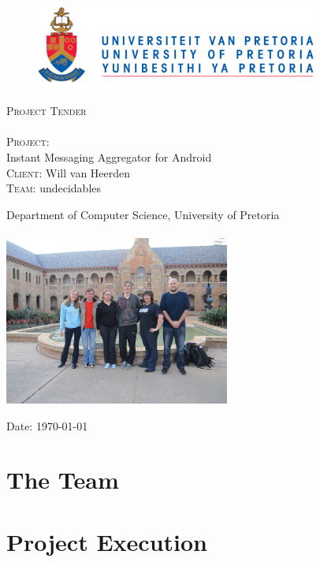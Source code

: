 \documentclass[12pt]{article}
\begin{document}
\begin{titlepage}
	\begin{center}
		
		\begin{figure}[t]
			\centering
			\includegraphics[width=350px]{UP_Logo.png}
		\end{figure}
		
		\textsc{\Huge Project Tender} \\ 

		\textsc{\huge \\Project:\\	}
		\huge Instant Messaging Aggregator for Android 
		\textsc{\Large \\Client:}
		\large Will van Heerden \\

		\textsc{\huge Team:}
		\huge \textsc{}undecidables\textsc{}
		
		\small Department of Computer Science, University of Pretoria \\
		\hfill \\
		\includegraphics[width=280px]{Team.JPG}\\

	\vfill

	{\large Date: \today}		
		
		
	\end{center}
\end{titlepage}

\pagebreak
\tableofcontents

\pagebreak
\section{The Team}


\pagebreak
\section{Project Execution}

\end{document}
